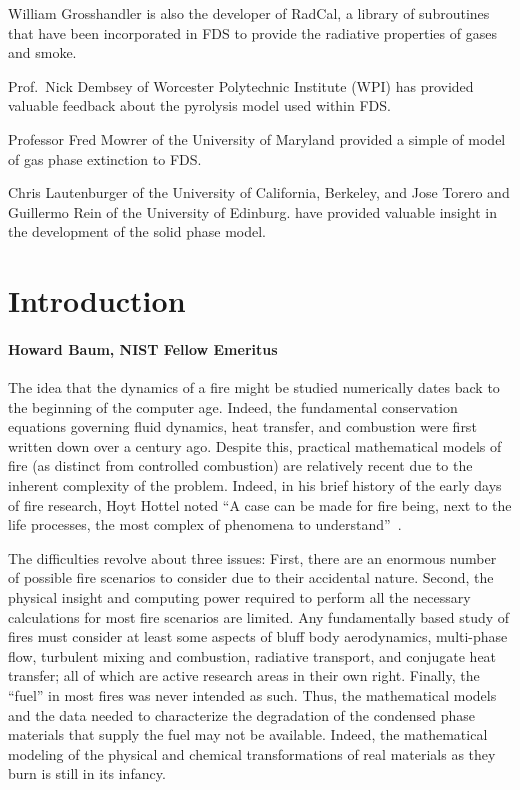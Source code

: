 \documentclass[11pt]{book}
\begin{document}
William Grosshandler is also the developer of RadCal, a library of
subroutines that have been incorporated in FDS to provide the
radiative properties of gases and smoke.

Prof.~Nick Dembsey of Worcester Polytechnic Institute (WPI) has provided valuable feedback about the pyrolysis model used within FDS.

Professor Fred Mowrer of the University of Maryland provided a simple
of model of gas phase extinction to FDS.

Chris Lautenburger of the University of California, Berkeley, and Jose Torero and Guillermo Rein of the University of Edinburg. have
provided valuable insight in the development of the solid phase model.












\tableofcontents

\mainmatter


\chapter{Introduction}
\subsubsection{Howard Baum, NIST Fellow Emeritus}

The idea that the dynamics of a fire might be studied numerically dates back
to the beginning of the computer age. Indeed, the fundamental
conservation equations governing fluid dynamics, heat transfer, and
combustion were first written down over a century ago.
Despite this, practical mathematical models of fire
(as distinct from controlled combustion) are relatively recent due
to the inherent complexity of the problem.
Indeed, in his brief history of the early days of fire research,
Hoyt Hottel noted ``A case can be made for fire being,
next to the life processes, the most complex of phenomena to understand''~\cite{Hottel:1}.

The difficulties revolve about three issues:
First, there are an enormous number of possible fire scenarios
to consider due to their accidental nature. Second, the physical
insight and computing power required to perform all the necessary calculations
for most fire scenarios are limited. Any fundamentally based study of fires
must consider at least some aspects of bluff body aerodynamics, multi-phase flow,
turbulent mixing and combustion, radiative transport, and conjugate heat transfer;
all of which are active research areas in their own right.
Finally, the ``fuel'' in most fires was never intended as such.
Thus, the mathematical models and the data needed to characterize the
degradation of the condensed phase materials that supply the fuel may not be available.
Indeed, the mathematical modeling of the physical and
chemical transformations of real materials as they burn is still in its infancy.
\end{document}
